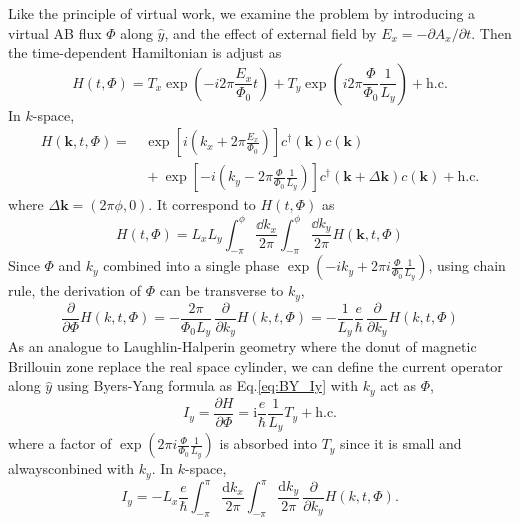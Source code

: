 \documentclass[12pt,a4paper]{article}
\begin{document}
    Like the principle of virtual work, we examine the problem by introducing a virtual AB flux $\Phi$ along $\hat{y}$, and the effect of external field by $E_x = -\partial A_x/\partial t$. Then the time-dependent Hamiltonian is adjust as
    \begin{equation}
        H(t, \Phi)
        = T_x \exp\left(-i2\pi \frac{E_x}{\Phi_0}t\right)
        + T_y \exp\left(i2\pi\frac{\Phi}{\Phi_0}\frac{1}{L_y}\right)
        + \mathrm{h.c.}
    \end{equation}
    In $k$-space,
    \begin{equation}
    \label{eq:H_ktPhi}
    \begin{aligned}
        H(\mathbf{k}, t, \Phi)
        = &\, \exp\left[i\left(k_x + 2\pi\frac{E_x}{\Phi_0}\right)\right] c^{\dagger}(\mathbf{k}) c(\mathbf{k}) \\
        &\, + \exp\left[-i\left(k_y - 2\pi\frac{\Phi}{\Phi_0}\frac{1}{L_y}\right)\right] c^{\dagger}(\mathbf{k}+\Delta\mathbf{k}) c(\mathbf{k})
        + \mathrm{h.c.}
    \end{aligned}
    \end{equation}
    where $\Delta\mathbf{k} = (2\pi\phi, 0)$. It correspond to $H(t, \Phi)$ as
    \[
        H(t,\Phi) = L_x L_y \int_{-\pi}^{\phi} \frac{\dd k_x}{2\pi} \int_{-\pi}^{\phi} \frac{\dd k_y}{2\pi} H(\mathbf{k},t,\Phi)
    \]
    Since $\Phi$ and $k_y$ combined into a single phase $\exp(-ik_y + 2\pi i \frac{\Phi}{\Phi_0}\frac{1}{L_y})$, using chain rule, the derivation of $\Phi$ can be transverse to $k_y$,
    \begin{equation}
        \frac{\partial}{\partial \Phi} H(k, t, \Phi)
        = -\frac{2\pi}{\Phi_0 L_y} \, \frac{\partial}{\partial k_y} H(k, t, \Phi)
        = -\frac{1}{L_y} \frac{e}{\hbar} \, \frac{\partial}{\partial k_y} H(k, t, \Phi)
    \end{equation}
    As an analogue to Laughlin-Halperin geometry where the donut of magnetic Brillouin zone replace the real space cylinder, we can define the current operator along $\hat{y}$ using Byers-Yang formula as Eq.\eqref{eq:BY_Iy} with $k_y$ act as $\Phi$,
    \begin{equation}
        I_y = \frac{\partial H}{\partial \Phi}
        = \mathrm{i} \frac{e}{\hbar} \frac{1}{L_y} T_y + \mathrm{h.c.}
    \end{equation}
    where a factor of $\exp(2\pi i \frac{\Phi}{\Phi_0}\frac{1}{L_y})$ is absorbed into $T_y$ since it is small and alwaysconbined with $k_y$. In $k$-space,
    \begin{equation}
        I_y = -L_x \frac{e}{\hbar} \int_{-\pi}^{\pi} \frac{\mathrm{d}k_x}{2\pi} \int_{-\pi}^{\pi} \frac{\mathrm{d}k_y}{2\pi} \, \frac{\partial}{\partial k_y} H(k, t, \Phi).
    \end{equation}
\end{document}

